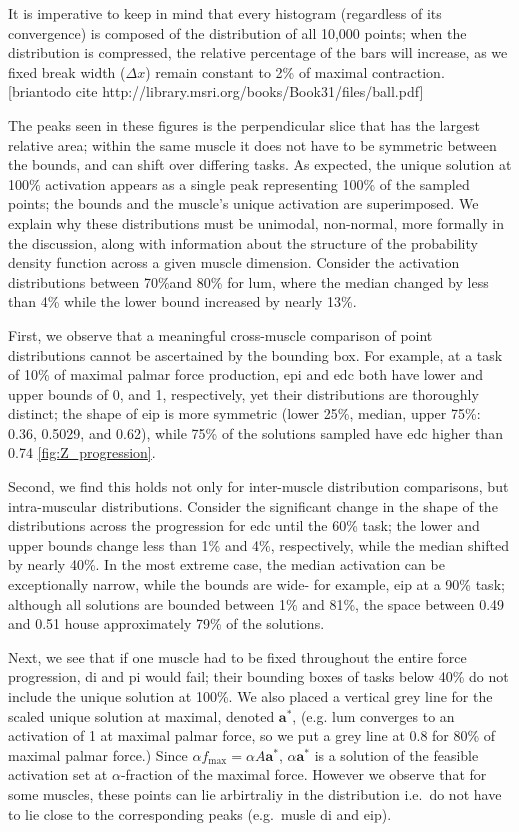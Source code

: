 It is imperative to keep in mind that every histogram (regardless of its convergence) is composed of the distribution of all 10,000 points; when the distribution is compressed, the relative percentage of the bars will increase, as we fixed break width ($\Delta x$) remain constant to 2\% of maximal contraction. [briantodo cite http://library.msri.org/books/Book31/files/ball.pdf]

The peaks seen in these figures is the perpendicular slice that has the largest relative area; within the same muscle it does not have to be symmetric between the bounds, and can shift over differing tasks.
As expected, the unique solution at 100\% activation appears as a single peak representing 100\% of the sampled points; the bounds and the muscle's unique activation are superimposed. We explain why these distributions must be unimodal, non-normal, more formally in the discussion, along with information about the structure of the probability density function across a given muscle dimension.
Consider the activation distributions between 70\%and 80\% for lum, where the median changed by less than 4\% while the lower bound increased by nearly 13\%.

First, we observe that a meaningful cross-muscle comparison of point distributions cannot be ascertained by the bounding box. For example, at a task of 10\% of maximal palmar force production, epi and edc both have lower and upper bounds of 0, and 1, respectively, yet their distributions are thoroughly distinct; the shape of eip is more symmetric (lower 25\%, median, upper 75\%: 0.36, 0.5029, and 0.62), while 75\% of the solutions sampled have edc higher than 0.74 \ref{fig:Z_progression}. 

Second, we find this holds not only for inter-muscle distribution comparisons, but intra-muscular distributions. Consider the significant change in the shape of the distributions across the progression for edc until the 60\% task; the lower and upper bounds change less than 1\% and 4\%, respectively, while the median shifted by nearly 40\%.
In the most extreme case, the median activation can be exceptionally narrow, while the bounds are wide- for example, eip at a 90\% task; although all solutions are bounded between 1\% and 81\%, the space between 0.49 and 0.51 house approximately 79\% of the solutions.

Next, we see that if one muscle had to be fixed throughout the entire force progression, di and pi would fail; their bounding boxes of tasks below 40\% do not include the unique solution at 100\%. We also placed a vertical grey line for the scaled unique solution at maximal, denoted $\textbf{a}^*$, (e.g. lum converges to an activation of 1 at maximal palmar force, so we put a grey line at 0.8 for 80\% of maximal palmar force.) Since $\alpha f_{\max} = \alpha A \textbf{a}^*$, $\alpha \textbf{a}^*$ is a solution of the feasible activation set at $\alpha$-fraction of the maximal force. However we observe that for some muscles, these points can lie arbirtraliy in the distribution i.e.\ do not have to lie close to the corresponding peaks (e.g.\ musle di and eip).

